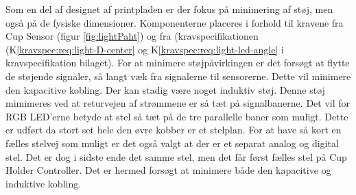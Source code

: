 \documentclass[Rapport/Rapport_main.tex]{subfiles}
\begin{document}
Som en del af designet af printpladen er der fokus på minimering af støj, men også på de fysiske dimensioner. Komponenterne placeres i forhold til kravene fra Cup Sensor (figur \ref{fig:lightPaht}) og fra (kravspecifikationen (K\ref{kravspec:req:light-D-center} og K\ref{kravspec:req:light-led-angle} i kravspecifikation bilaget).
For at minimere støjpåvirkingen er det forsøgt at flytte de støjende signaler, så langt væk fra signalerne til sensorerne. Dette vil minimere den kapacitive kobling. Der kan stadig være noget induktiv støj. Denne støj mimimeres ved at returvejen af strømmene er så tæt på signalbanerne. Det vil for RGB LED'erne betyde at stel så tæt på de tre parallelle baner som muligt. Dette er udført da stort set hele den øvre kobber er et stelplan. For at have så kort en fælles stelvej som muligt er det også valgt at der er et separat analog og digital stel. Det er dog i sidste ende det samme stel, men det får først fælles stel på Cup Holder Controller.
Det er hermed forsøgt at minimere både den kapacitive og induktive kobling.
\end{document}
